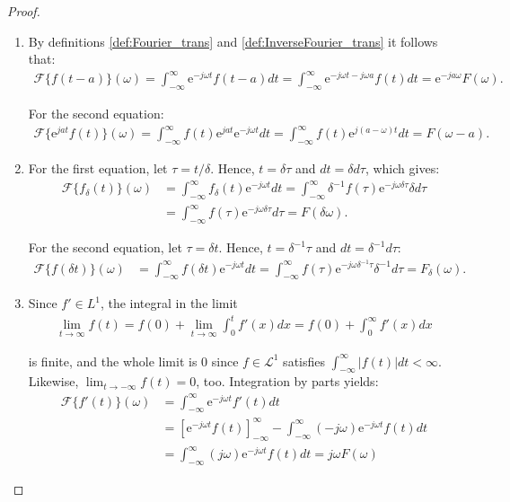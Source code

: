 \begin{proof}
\begin{enumerate}[label=(\alph*)]
\item
By definitions \ref{def:Fourier_trans} and \ref{def:InverseFourier_trans} it follows that:
\begin{align*}
\mathcal{F}\{f(t-a)\}(\omega) = \int_{-\infty}^\infty \text{e}^{-j\omega t} f(t - a) dt = \int_{-\infty}^\infty \text{e}^{-j\omega t - j\omega a} f(t) dt = \text{e}^{-ja \omega} F(\omega).
\end{align*}

For the second equation:
\begin{align*}
\mathcal{F}\{\text{e}^{jat} f(t)\}(\omega) = \int_{-\infty}^\infty f(t) \text{e}^{jat} \text{e}^{-j \omega t} dt = \int_{-\infty}^\infty f(t) \text{e}^{j(a- \omega)t} dt = F(\omega - a).
\end{align*}

\item For the first equation, let $\tau = t/\delta$. Hence, $t = \delta \tau$ and $dt = \delta d\tau$, which gives:
\begin{align*}
\mathcal{F}\{f_\delta(t)\}(\omega) &= \int_{-\infty}^\infty f_\delta(t) \text{e}^{-j \omega t} dt = \int_{-\infty}^\infty \delta^{-1}f(\tau) \text{e}^{-j \omega \delta\tau} \delta d\tau \\
&= \int_{-\infty}^\infty f(\tau) \text{e}^{-j \omega \delta\tau} d\tau = F(\delta\omega).
\end{align*}

For the second equation, let $\tau = \delta t$. Hence, $t = \delta^{-1}\tau$ and $dt = \delta^{-1} d\tau$:
\begin{align*}
\mathcal{F}\{f(\delta t)\}(\omega) &= \int_{-\infty}^\infty f(\delta t) \text{e}^{-j \omega t} dt = \int_{-\infty}^\infty f(\tau) \text{e}^{-j \omega \delta^{-1}\tau} \delta^{-1} d\tau = F_\delta(\omega).
\end{align*}

\item Since $f' \in L^1$, the integral in the limit
\begin{align*}
\lim_{t \to \infty} f(t) = f(0) + \lim_{t\to\infty} \int_0^t f'(x) dx = f(0) + \int_0^\infty f'(x) dx
\end{align*}

is finite, and the whole limit is 0 since $f \in \mathcal{L}^1$ satisfies $\int_{-\infty}^\infty |f(t)| dt < \infty$. Likewise, $\displaystyle{\lim_{t \to -\infty} f(t) = 0}$, too. Integration by parts yields:
\begin{align*}
\mathcal{F}\{f'(t)\}(\omega) &= \int_{-\infty}^\infty \text{e}^{-j \omega t} f'(t) dt \\
&= \left[ \text{e}^{-j\omega t} f(t) \right]_{-\infty}^\infty - \int_{-\infty}^\infty (-j \omega) \text{e}^{-j \omega t} f(t) dt \\
&= \int_{-\infty}^\infty (j \omega) \text{e}^{-j \omega t} f(t) dt = j\omega F(\omega)
\end{align*}


\end{enumerate}
\end{proof}
